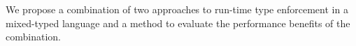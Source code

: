 We propose a combination of two approaches to run-time type enforcement in a
mixed-typed language and a method to evaluate the performance benefits of the
combination.
